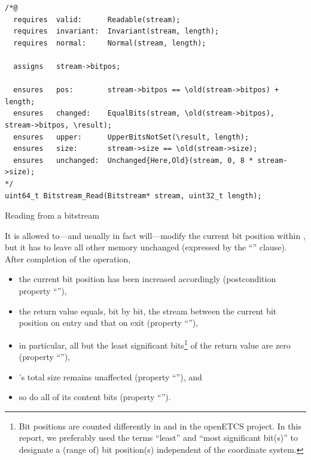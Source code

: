 \begin{listing}[hbt]
\begin{minipage}{0.99\textwidth}
\begin{lstlisting}[style=acsl-block]
/*@
  requires  valid:      Readable(stream);
  requires  invariant:  Invariant(stream, length);
  requires  normal:     Normal(stream, length);

  assigns   stream->bitpos;

  ensures   pos:        stream->bitpos == \old(stream->bitpos) + length;
  ensures   changed:    EqualBits(stream, \old(stream->bitpos), stream->bitpos, \result);
  ensures   upper:      UpperBitsNotSet(\result, length);
  ensures   size:       stream->size == \old(stream->size);
  ensures   unchanged:  Unchanged{Here,Old}(stream, 0, 8 * stream->size);
*/
uint64_t Bitstream_Read(Bitstream* stream, uint32_t length);
\end{lstlisting}
\end{minipage}
\caption{\label{lst:Bitstream_Read spec}Reading from a bitstream}
\end{listing}

\FloatBarrier

It is allowed to---and usually in fact will---modify the current bit
position within , but it has to leave all other memory
unchanged (expressed by the ``'' clause).
%
After completion of the operation, 
%
\begin{itemize}
\item the current bit position has been increased accordingly
	(postcondition property ``''),
\item the return value equals, bit by bit, the stream between the
	current bit position on entry and that on exit
	(property ``''),
\item in particular, all but the  least significant
	bits\footnote{
		Bit positions are counted differently in \framac and in
		the openETCS project.
		In this report, we preferably used the terms ``least''
		and ``most significant bit(s)'' to
		designate a (range of) bit position(s) independent of
		the coordinate system.
	}
	of the return value are zero
	(property ``''),
\item {}'s total size remains unaffected
	(property ``''), and
\item so do all of its content bits
	(property ``'').
\end{itemize}


